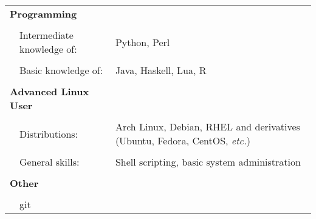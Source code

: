 \documentclass[a4paper,10pt]{article} %
\begin{document}
\begin{tabularx}{\textwidth}{p{0.3cm}|p{4cm}X}
\multicolumn{2}{l}{\textbf{Programming}}         & \\
\multicolumn{3}{c}{} \\ %
  &  Intermediate knowledge of:                  & Python, Perl \\
     \\
  &  Basic knowledge of:                         & Java, Haskell, Lua, R \\
\multicolumn{3}{c}{} \\ %
\multicolumn{2}{l}{\textbf{Advanced Linux User}} & \\
\multicolumn{3}{c}{} \\ %
   & Distributions:                              & Arch Linux, Debian, RHEL and derivatives (Ubuntu, Fedora, CentOS, \emph{etc.}) \\
     \\
   & General skills:                             & Shell scripting, basic system administration \\
\multicolumn{3}{c}{} \\ %
 \multicolumn{2}{l}{\textbf{Other}}              & \\    
\multicolumn{3}{c}{} \\ %
   & \multicolumn{2}{l}{git}
\end{tabularx}

\smallskip
\end{document}
